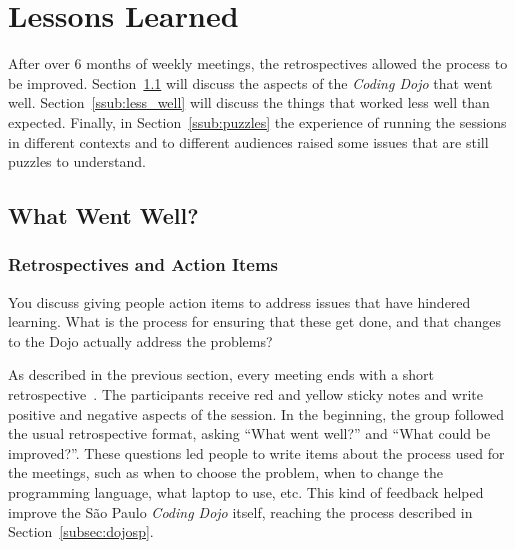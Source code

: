 \section{Lessons Learned}\label{sec:lessons_learned}

After over 6 months of weekly meetings, the retrospectives allowed
the process to be improved. Section~\ref{ssub:well} will discuss the
aspects of the \emph{Coding Dojo} that went well. Section~\ref{ssub:less_well}
will discuss the things that worked less well than expected. Finally, in
Section~\ref{ssub:puzzles} the experience of running the sessions in different
contexts and to different audiences raised some issues that are still puzzles
to understand.

\subsection{What Went Well?}\label{ssub:well}

\subsubsection{Retrospectives and Action Items}

{\Large You discuss giving people action items to address issues that
  have hindered learning. What is the process for ensuring that these
  get done, and that changes to the Dojo actually address the
  problems?}

As described in the previous section, every meeting ends with a
short retrospective~\cite{Retro}. The participants receive red and yellow sticky
notes and write positive and negative aspects of the session. In the
beginning, the group followed the usual retrospective format,
asking ``What went well?'' and ``What could be improved?''.
These questions led people to write items about the process used for
the meetings, such as when to choose the problem, when to change the
programming language, what laptop to use, etc. This kind of feedback
helped improve the São Paulo \emph{Coding Dojo} itself, reaching the
process described in Section~\ref{subsec:dojosp}.

